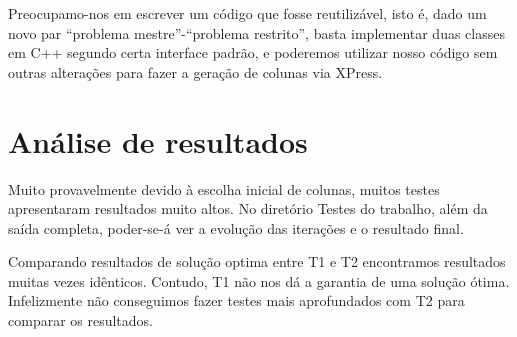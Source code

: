 \documentclass[letterpaper,11pt]{article}
\begin{document}
Preocupamo-nos em escrever um código que fosse reutilizável, isto é,
dado um novo par ``problema mestre''-``problema restrito'', basta
implementar duas classes em C++ segundo certa interface padrão, e
poderemos utilizar nosso código sem outras alterações para fazer a
geração de colunas via XPress.

\section{Análise de resultados}
Muito provavelmente devido à escolha inicial de colunas, muitos testes
apresentaram resultados muito altos. No diretório Testes do trabalho,
além da saída completa, poder-se-á ver a evolução das iterações e o
resultado final. 

Comparando resultados de solução optima entre T1 e T2 encontramos
resultados muitas vezes idênticos. Contudo, T1 não nos dá a garantia de
uma solução ótima. Infelizmente não conseguimos fazer testes mais
aprofundados com T2 para comparar os resultados.



\end{document}
